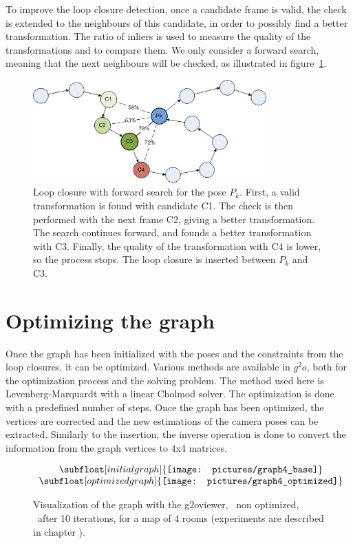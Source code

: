 To improve the loop closure detection, once a candidate frame is valid, the check is extended to the neighbours of this candidate, in order to possibly find a better transformation. The ratio of inliers is used to measure the quality of the transformations and to compare them. We only consider a forward search, meaning that the next neighbours will be checked, as illustrated in figure~\ref{fig:lc_candidate}.

\begin{figure}[H]
\centering
 \includegraphics[width=0.8\textwidth]{figures/graph_lc_candidate}
\caption{Loop closure with forward search for the pose $P_k$. First, a valid transformation is found with candidate C1. The check is then performed with the next frame C2, giving a better transformation. The search continues forward, and founds a better transformation with C3. Finally, the quality of the transformation with C4 is lower, so the process stops. The loop closure is inserted between $P_k$ and C3.}
\label{fig:lc_candidate}
\end{figure}

\section{Optimizing the graph}

Once the graph has been initialized with the poses and the constraints from the loop closures, it can be optimized. Various methods are available in $g^2o$, both for the optimization process and the solving problem. The method used here is Levenberg-Marquardt with a linear Cholmod solver. The optimization is done with a predefined number of steps. Once the graph has been optimized, the vertices are corrected and the new estimations of the camera poses can be extracted. Similarly to the insertion, the inverse operation is done to convert the information from the graph vertices to 4x4 matrices.

\begin{figure}[H]
\centering$
 \begin{array}{c}
 \subfloat[initial graph]{\label{fig:g2o_view_1}\texttt{[image: pictures/graph4\_base]}} \\
 \subfloat[optimized graph]{\label{fig:g2o_view_2}\texttt{[image: pictures/graph4\_optimized]}}
 \end{array}$
\caption{Visualization of the graph with the g2oviewer, ~non optimized, ~after 10 iterations, for a map of 4 rooms (experiments are described in chapter \protect{\ref{chap:experiments}}).}
\end{figure}
\clearpage


